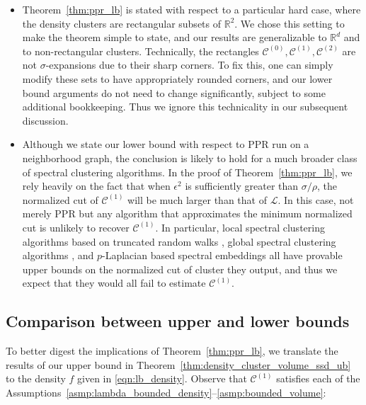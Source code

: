 \documentclass[11pt,twoside]{article}
\theoremstyle{definition}
\newcommand{\Reals}{\mathbb{R}}
\newcommand{\1}{\mathbf{1}}
\newcommand{\mc}[1]{\mathcal{#1}}
\begin{document}
\begin{itemize}
	\item Theorem~\ref{thm:ppr_lb} is stated with respect to a particular hard case, where the density clusters are rectangular subsets of $\Reals^2$.  We chose this
	setting to make the theorem simple to state, and our results are generalizable
	to $\Reals^d$ and to non-rectangular clusters. Technically, the rectangles $\mc{C}^{(0)},\mc{C}^{(1)},\mc{C}^{(2)}$ are not
	$\sigma$-expansions due to their sharp corners. To fix this, one can   
	simply modify these sets to have appropriately rounded corners, and our lower
	bound arguments do not need to change significantly, subject to some
	additional bookkeeping.  Thus we ignore this technicality in our subsequent
	discussion. 
	
	\item Although we state our lower bound with respect to PPR run on a neighborhood graph, the conclusion is likely to hold for a much broader class of spectral clustering algorithms. In the proof of Theorem~\ref{thm:ppr_lb}, we rely heavily on the fact that when $\epsilon^2$ is sufficiently greater than $\sigma/\rho$, the normalized cut of $\mc{C}^{(1)}$ will be much larger than that of $\mathcal{L}$. In this case, not merely PPR but any algorithm that approximates the minimum normalized cut is unlikely to recover $\mc{C}^{(1)}$. In particular, local spectral clustering
	algorithms based on truncated random walks \citep{spielman2013}, global spectral
	clustering algorithms \citep{shi00}, and $p$-Laplacian based spectral embeddings
	\citep{hein2010} all have provable upper bounds on the normalized cut of cluster
	they output, and thus we expect that they would all fail to estimate $\mc{C}^{(1)}$.
\end{itemize}

\subsection{Comparison between upper and lower bounds}
\label{subsec:comparison_upper_lower_bounds}

To better digest the implications of Theorem~\ref{thm:ppr_lb}, we translate the
results of our upper bound in Theorem~\ref{thm:density_cluster_volume_ssd_ub} to the density $f$ given in \eqref{eqn:lb_density}. Observe that $\mc{C}^{(1)}$ satisfies each of the Assumptions~\ref{asmp:lambda_bounded_density}--\ref{asmp:bounded_volume}:
\end{document}
